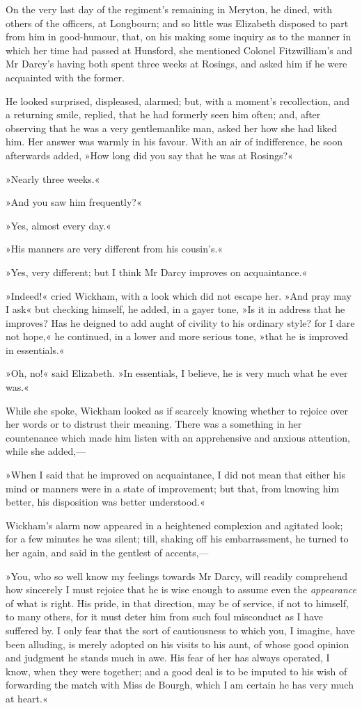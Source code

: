 On the very last day of the regiment's remaining in Meryton, he dined, with others of the officers, at Longbourn; and so little was Elizabeth disposed to part from him in good-humour, that, on his making some inquiry as to the manner in which her time had passed at Hunsford, she mentioned Colonel Fitzwilliam's and Mr Darcy's having both spent three weeks at Rosings, and asked him if he were acquainted with the former.

He looked surprised, displeased, alarmed; but, with a moment's recollection, and a returning smile, replied, that he had formerly seen him often; and, after observing that he was a very gentlemanlike man, asked her how she had liked him. Her answer was warmly in his favour. With an air of indifference, he soon afterwards added, »How long did you say that he was at Rosings?«

»Nearly three weeks.«

»And you saw him frequently?«

»Yes, almost every day.«

»His manners are very different from his cousin's.«

»Yes, very different; but I think Mr Darcy improves on acquaintance.«

»Indeed!« cried Wickham, with a look which did not escape her. »And pray may I ask\longdash« but checking himself, he added, in a gayer tone, »Is it in address that he improves? Has he deigned to add aught of civility to his ordinary style? for I dare not hope,« he continued, in a lower and more serious tone, »that he is improved in essentials.«

»Oh, no!« said Elizabeth. »In essentials, I believe, he is very much what he ever was.«

While she spoke, Wickham looked as if scarcely knowing whether to rejoice over her words or to distrust their meaning. There was a something in her countenance which made him listen with an apprehensive and anxious attention, while she added,—

»When I said that he improved on acquaintance, I did not mean that either his mind or manners were in a state of improvement; but that, from knowing him better, his disposition was better understood.«

Wickham's alarm now appeared in a heightened complexion and agitated look; for a few minutes he was silent; till, shaking off his embarrassment, he turned to her again, and said in the gentlest of accents,—

»You, who so well know my feelings towards Mr Darcy, will readily comprehend how sincerely I must rejoice that he is wise enough to assume even the \textit{appearance} of what is right. His pride, in that direction, may be of service, if not to himself, to many others, for it must deter him from such foul misconduct as I have suffered by. I only fear that the sort of cautiousness to which you, I imagine, have been alluding, is merely adopted on his visits to his aunt, of whose good opinion and judgment he stands much in awe. His fear of her has always operated, I know, when they were together; and a good deal is to be imputed to his wish of forwarding the match with Miss de Bourgh, which I am certain he has very much at heart.«

